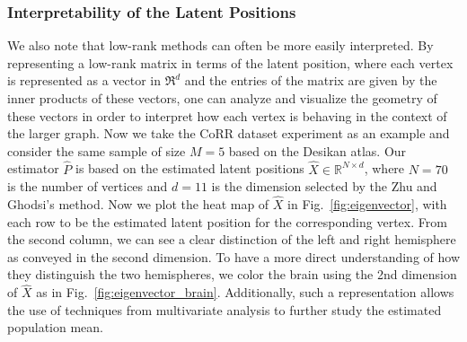 \documentclass[simplex.tex]{subfiles}
\begin{document}
\subsubsection{Interpretability of the Latent Positions}
We also note that low-rank methods can often be more easily interpreted.
By representing a low-rank matrix in terms of the latent position, where each vertex is represented as a vector in $\Re^d$ and the entries of the matrix are given by the inner products of these vectors, one can analyze and visualize the geometry of these vectors in order to interpret how each vertex is behaving in the context of the larger graph. 
Now we take the CoRR dataset experiment as an example and consider the same sample of size $M=5$ based on the Desikan atlas. Our estimator $\hat{P}$ is based on the estimated latent positions $\hat{X} \in \mathbb{R}^{N\times d}$, where $N=70$ is the number of vertices and $d=11$ is the dimension selected by the Zhu and Ghodsi's method. Now we plot the heat map of $\hat{X}$ in Fig.~\ref{fig:eigenvector}, with each row to be the estimated latent position for the corresponding vertex. From the second column, we can see a clear distinction of the left and right hemisphere as conveyed in the second dimension. To have a more direct understanding of how they distinguish the two hemispheres, we color the brain using the 2nd dimension of $\hat{X}$ as in Fig.~\ref{fig:eigenvector_brain}. Additionally, such a representation allows the use of techniques from multivariate analysis to further study the estimated population mean.
\end{document}

